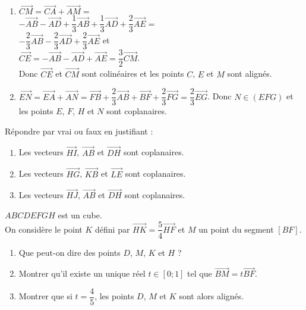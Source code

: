 \begin{colonne*exercice}
\begin{corrige}
\begin{enumerate}
\item $\overrightarrow{CM}=\overrightarrow{CA}+\overrightarrow{AM}=$\\
$-\overrightarrow{AB}-\overrightarrow{AD}+
\dfrac{1}{3}\overrightarrow{AB}+\dfrac{1}{3}\overrightarrow{AD}+\dfrac{2}{3}\overrightarrow{AE}=$\\
$-\dfrac{2}{3}\overrightarrow{AB}-\dfrac{2}{3}\overrightarrow{AD}+\dfrac{2}{3}\overrightarrow{AE}$ et \\ 
$\overrightarrow{CE}=-\overrightarrow{AB}-\overrightarrow{AD}+\overrightarrow{AE}=\dfrac{3}{2}\overrightarrow{CM}$.\\
Donc $\overrightarrow{CE}$ et $\overrightarrow{CM}$ sont colinéaires et 
les points $C$, $E$ et $M$ sont alignés.

\item $\overrightarrow{EN}=\overrightarrow{EA}+\overrightarrow{AN}=\overrightarrow{FB}+\dfrac{2}{3}\overrightarrow{AB}+\overrightarrow{BF}+\dfrac{2}{3}\overrightarrow{FG}=\dfrac{2}{3}\overrightarrow{EG}$.
Donc $N\in(EFG)$ et les points $E$, $F$, $H$ et $N$ sont coplanaires.
\end{enumerate}
\end{corrige}

\begin{exercice}
  Répondre par vrai ou faux en justifiant :
  \begin{enumerate}
  \item Les vecteurs $\overrightarrow{HI}$, $\overrightarrow{AB}$ et
    $\overrightarrow{DH}$ sont coplanaires.
  \item Les vecteurs $\overrightarrow{HG}$, $\overrightarrow{KB}$ et
    $\overrightarrow{LE}$ sont coplanaires.
  \item Les vecteurs $\overrightarrow{HJ}$, $\overrightarrow{AB}$ et
    $\overrightarrow{DH}$ sont coplanaires.
  \end{enumerate}
\end{exercice}

\begin{exercice}\label{G2Exo43}
  $ABCDEFGH$ est un cube.\\
  On considère le point $K$ défini par
  $\overrightarrow{HK}=\dfrac{5}{4}\overrightarrow{HF}$ et $M$ un
  point du segment $[BF]$.
  \begin{enumerate}
  \item Que peut-on dire des points $D$, $M$, $K$ et $H$ ?
  \item Montrer qu'il existe un unique réel $t\in\left[ 0;1\right] $
    tel que $\overrightarrow{BM}=t\overrightarrow{BF}$.
  \item Montrer que si $t=\dfrac{4}{5}$, les points $D$, $M$ et $K$
    sont alors alignés.
  \end{enumerate}
\end{exercice}


\end{colonne*exercice}
